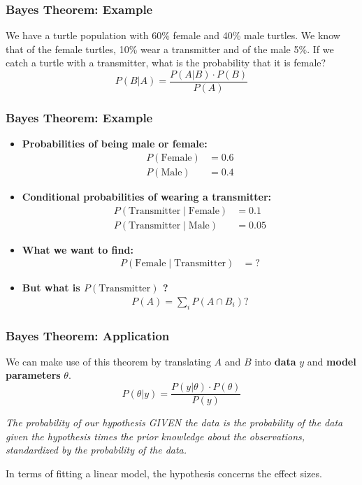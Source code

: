 \documentclass{beamer}
\begin{document}
\begin{frame}
    \frametitle{Bayes Theorem: Example}
    \large
    We have a turtle population with 60\% female and 40\% male turtles. We know that of the female turtles, 10\% wear a transmitter and of the male 5\%. If we catch a turtle with a transmitter, what is the probability that it is female?
    \vspace{0.5cm}
    \[
    P(B|A) = \frac{P(A|B) \cdot P(B)}{P(A)}
    \]
    
\end{frame}

\begin{frame}
    \frametitle{Bayes Theorem: Example}
    \large

    \begin{itemize}
    \item \textbf{Probabilities of being male or female:}
    \begin{align*}
        P(\text{Female}) &= 0.6  \\
        P(\text{Male}) &= 0.4 
    \end{align*}

    \item \textbf{Conditional probabilities of wearing a transmitter:}
    \begin{align*}
        P(\text{Transmitter} \mid \text{Female}) &= 0.1  \\
        P(\text{Transmitter} \mid \text{Male}) &= 0.05 
    \end{align*}

    \item \textbf{What we want to find:}
    \begin{align*}
        P(\text{Female} \mid \text{Transmitter}) &= ?
    \end{align*}

    \item \textbf{But what is $P(\text{Transmitter})$ ?}
    \begin{align*}
        P(A) = \sum_i P(A \cap B_i)?
    \end{align*}
\end{itemize}
\end{frame}

\begin{frame}
    \frametitle{Bayes Theorem: Application}
    We can make use of this theorem by translating $A$ and $B$ into \textbf{data} $y$ and \textbf{model parameters} $\theta$.\\
    \[
    P(\theta|y) = \frac{P(y|\theta) \cdot P(\theta)}{P(y)}
    \]
    \vspace{0.2cm}
    
    \textit{The probability of our hypothesis GIVEN the data is the probability of the data given the hypothesis times the prior knowledge about the observations, standardized by the probability of the data.}
    \vspace{0.2cm}
    
    In terms of fitting a linear model, the hypothesis concerns the effect sizes. 
\end{frame}
\end{document}
